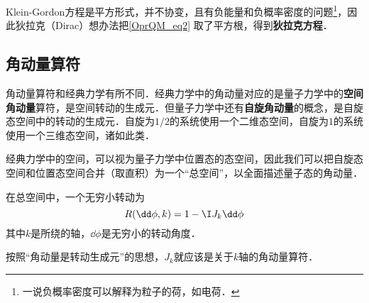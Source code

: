Klein-Gordon方程是平方形式，并不协变，且有负能量和负概率密度的问题\footnote{一说负概率密度可以解释为粒子的荷，如电荷．}，因此狄拉克（Dirac）想办法把\autoref{OprQM_eq2} 取了平方根，得到\textbf{狄拉克方程}．



\subsection{角动量算符}\label{OprQM_sub1}

角动量算符和经典力学有所不同．经典力学中的角动量对应的是量子力学中的\textbf{空间角动量}算符，是空间转动的生成元．但量子力学中还有\textbf{自旋角动量}的概念，是自旋态空间中的转动的生成元．自旋为$1/2$的系统使用一个二维态空间，自旋为$1$的系统使用一个三维态空间，诸如此类．

经典力学中的空间，可以视为量子力学中位置态的态空间，因此我们可以把自旋态空间和位置态空间合并（取直积）为一个“总空间”，以全面描述量子态的角动量．

在总空间中，一个无穷小转动为
\begin{equation}
R(\dd \phi, k) = 1-\I J_k\dd \phi
\end{equation}
其中$k$是所绕的轴，$\dd \phi$是无穷小的转动角度．

按照“角动量是转动生成元”的思想，$J_k$就应该是关于$k$轴的角动量算符．




















